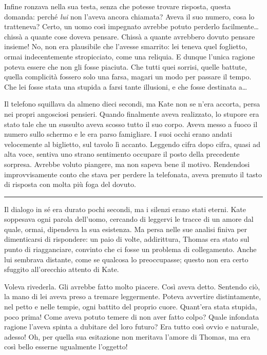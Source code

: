 \documentclass[a4paper,oneside,11pt]{memoir}
\begin{document}
Infine ronzava nella sua testa, senza che potesse trovare risposta, questa domanda: perché \emph{lui} non l'aveva ancora
chiamata? Aveva il suo numero, cosa lo tratteneva? Certo, un uomo così impegnato avrebbe potuto perderlo
facilmente\dots{} chissà a quante cose doveva pensare. Chissà a quante avrebbero dovuto pensare insieme! No, non era
plausibile che l'avesse smarrito: lei teneva quel foglietto, ormai indecentemente stropicciato, come una reliquia. E
dunque l'unica ragione poteva essere che non gli fosse piaciuta. Che tutti quei sorrisi, quelle battute, quella
complicità fossero solo una farsa, magari un modo per passare il tempo. Che lei fosse stata una stupida a farsi tante
illusioni, e che fosse destinata a\dots{}

Il telefono squillava da almeno dieci secondi, ma Kate non se n'era accorta, persa nei propri angosciosi pensieri.
Quando finalmente aveva realizzato, lo stupore era stato tale che un sussulto aveva scosso tutto il suo corpo. Aveva
messo a fuoco il numero sullo schermo e le era parso famigliare. I suoi occhi erano andati velocemente al biglietto, sul
tavolo lì accanto. Leggendo cifra dopo cifra, quasi ad alta voce, sentiva uno strano sentimento occupare il posto della
precedente sorpresa. Avrebbe voluto piangere, ma non sapeva bene il motivo. Rendendosi improvvisamente conto che stava
per perdere la telefonata, aveva premuto il tasto di risposta con molta più foga del dovuto.

\plainbreak{1}

Il dialogo in sé era durato pochi secondi, ma i silenzi erano stati eterni. Kate soppesava ogni parola dell'uomo,
cercando di leggervi le tracce di un amore dal quale, ormai, dipendeva la sua esistenza. Ma persa nelle sue analisi
finiva per dimenticarsi di rispondere: un paio di volte, addirittura, Thomas era stato sul punto di riagganciare,
convinto che ci fosse un problema di collegamento. Anche lui sembrava distante, come se qualcosa lo preoccupasse; questo
non era certo sfuggito all'orecchio attento di Kate.

Voleva rivederla. Gli avrebbe fatto molto piacere. Così aveva detto. Sentendo ciò, la mano di lei aveva preso a tremare
leggermente. Poteva avvertire distintamente, nel petto e nelle tempie, ogni battito del proprio cuore. Quant'era stata
stupida, poco prima! Come aveva potuto temere di non aver fatto colpo? Quale infondata ragione l'aveva spinta a dubitare
del loro futuro? Era tutto così ovvio e naturale, adesso! Oh, per quella sua esitazione non meritava l'amore di Thomas,
ma era così bello esserne ugualmente l'oggetto!
\end{document}
